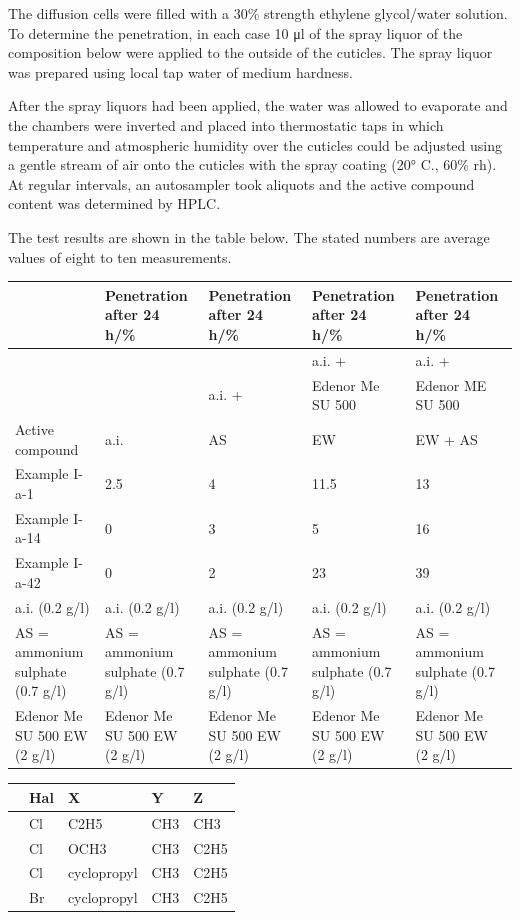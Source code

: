 \documentclass[11pt,a4paper]{article}
\begin{document}
The diffusion cells were filled with a 30\% strength ethylene glycol/water solution. To determine the penetration, in each case 10 μl of the spray liquor of the composition below were applied to the outside of the cuticles. The spray liquor was prepared using local tap water of medium hardness.

After the spray liquors had been applied, the water was allowed to evaporate and the chambers were inverted and placed into thermostatic taps in which temperature and atmospheric humidity over the cuticles could be adjusted using a gentle stream of air onto the cuticles with the spray coating (20° C., 60\% rh). At regular intervals, an autosampler took aliquots and the active compound content was determined by HPLC.

The test results are shown in the table below. The stated numbers are average values of eight to ten measurements.

\begin{table}[h]
\begin{tabular}{|l|l|l|l|l|}
\hline
 & Penetration after 24 h/\% & Penetration after 24 h/\% & Penetration after 24 h/\% & Penetration after 24 h/\% \\ \hline
 &  &  & a.i. + & a.i. + \\ \hline
 &  & a.i. + & Edenor Me SU 500 & Edenor ME SU 500 \\ \hline
Active compound & a.i. & AS & EW & EW + AS \\ \hline
Example I-a-1 & 2.5 & 4 & 11.5 & 13 \\ \hline
Example I-a-14 & 0 & 3 & 5 & 16 \\ \hline
Example I-a-42 & 0 & 2 & 23 & 39 \\ \hline
a.i. (0.2 g/l) & a.i. (0.2 g/l) & a.i. (0.2 g/l) & a.i. (0.2 g/l) & a.i. (0.2 g/l) \\ \hline
AS = ammonium sulphate (0.7 g/l) & AS = ammonium sulphate (0.7 g/l) & AS = ammonium sulphate (0.7 g/l) & AS = ammonium sulphate (0.7 g/l) & AS = ammonium sulphate (0.7 g/l) \\ \hline
Edenor Me SU 500 EW (2 g/l) & Edenor Me SU 500 EW (2 g/l) & Edenor Me SU 500 EW (2 g/l) & Edenor Me SU 500 EW (2 g/l) & Edenor Me SU 500 EW (2 g/l) \\ \hline
\end{tabular}
\end{table}

\begin{table}[h]
\begin{tabular}{|l|l|l|l|l|}
\hline
 & Hal & X & Y & Z \\ \hline
 & Cl & C2H5 & CH3 & CH3 \\ \hline
 & Cl & OCH3 & CH3 & C2H5 \\ \hline
 & Cl & cyclopropyl & CH3 & C2H5 \\ \hline
 & Br & cyclopropyl & CH3 & C2H5 \\ \hline
\end{tabular}
\end{table}
\end{document}
